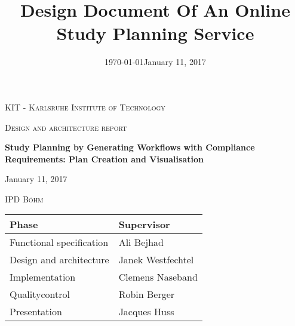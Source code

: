 \documentclass[11pt,a4paper]{report}
\date{\today}
\title{Design Document Of An Online Study Planning Service}
\date{January 11, 2017}
\begin{document}
	\sloppy
	
	\begin{titlepage}
		\centering
		{\scshape\LARGE KIT - Karlsruhe Institute of Technology \par}
		\vspace{1cm}
		{\scshape\Large Design and architecture report\par}
		\vspace{1.5cm}
		{\huge\bfseries %
		Study Planning by Generating Workflows with Compliance Requirements: Plan Creation and Visualisation\par
		}
		\vspace{2cm}
		{\large January 11, 2017\par}
		\vspace{1cm}
		\textsc{IPD B{\"o}hm}
		\vfill
		\begin{tabular}{| l | l |}
			\hline
			\textbf{Phase} & \textbf{Supervisor} \\ \hline
			Functional specification & Ali Bejhad \\
			Design and architecture & Janek Westfechtel \\
			Implementation & Clemens Naseband \\
			Qualitycontrol & Robin Berger \\
			Presentation  & Jacques Huss \\ \hline
		\end{tabular}
	\end{titlepage}

	\tableofcontents
\end{document}
